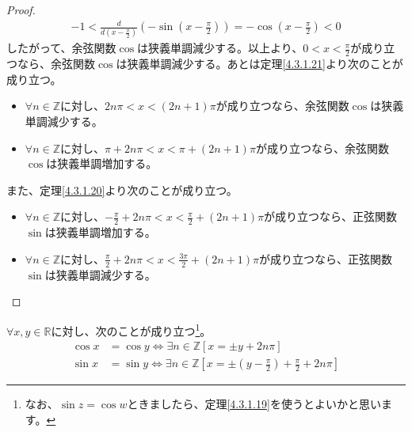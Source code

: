 \documentclass[dvipdfmx]{jsarticle}
\begin{document}
\begin{proof}
\begin{align*}
- 1 < \frac{d}{d\left( x - \frac{\pi}{2} \right)}\left( - \sin\left( x - \frac{\pi}{2} \right) \right) = - \cos\left( x - \frac{\pi}{2} \right) < 0
\end{align*}
したがって、余弦関数$\cos$は狭義単調減少する。以上より、$0 < x < \frac{\pi}{2}$が成り立つなら、余弦関数$\cos$は狭義単調減少する。あとは定理\ref{4.3.1.21}より次のことが成り立つ。
\begin{itemize}
\item
  $\forall n \in \mathbb{Z}$に対し、$2n\pi < x < (2n + 1)\pi$が成り立つなら、余弦関数$\cos$は狭義単調減少する。
\item
  $\forall n \in \mathbb{Z}$に対し、$\pi + 2n\pi < x < \pi + (2n + 1)\pi$が成り立つなら、余弦関数$\cos$は狭義単調増加する。
\end{itemize}
また、定理\ref{4.3.1.20}より次のことが成り立つ。
\begin{itemize}
\item
  $\forall n \in \mathbb{Z}$に対し、$- \frac{\pi}{2} + 2n\pi < x < \frac{\pi}{2} + (2n + 1)\pi$が成り立つなら、正弦関数$\sin$は狭義単調増加する。
\item
  $\forall n \in \mathbb{Z}$に対し、$\frac{\pi}{2} + 2n\pi < x < \frac{3\pi}{2} + (2n + 1)\pi$が成り立つなら、正弦関数$\sin$は狭義単調減少する。
\end{itemize}
\end{proof}
\begin{thm}\label{4.3.1.23}
$\forall x,y \in \mathbb{R}$に対し、次のことが成り立つ\footnote{なお、$\sin z = \cos w$ときましたら、定理\ref{4.3.1.19}を使うとよいかと思います。}。
\begin{align*}
\cos x &= \cos y \Leftrightarrow \exists n \in \mathbb{Z}[ x = \pm y + 2n\pi]\\
\sin x &= \sin y \Leftrightarrow \exists n \in \mathbb{Z}\left[ x = \pm \left( y - \frac{\pi}{2} \right) + \frac{\pi}{2} + 2n\pi \right]
\end{align*}
\end{thm}
\end{document}
